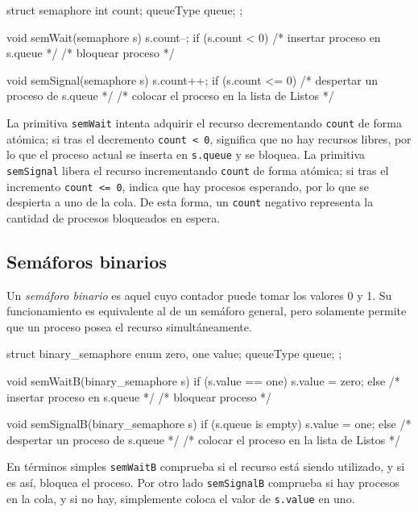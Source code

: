 \begin{ccode}[title=Definición de primitivas del semáforo]
struct semaphore {
  int count;
  queueType queue;
};

void semWait(semaphore s) {
  s.count--;
  if (s.count < 0) {
    /* insertar proceso en s.queue */
    /* bloquear proceso */
  }
}

void semSignal(semaphore s) {
  s.count++;
  if (s.count <= 0) {
    /* despertar un proceso de s.queue */
    /* colocar el proceso en la lista de Listos */
  }
}
\end{ccode}

La primitiva \texttt{semWait} intenta adquirir el recurso decrementando \texttt{count} de forma atómica; si tras el decremento \texttt{count < 0}, significa que no hay recursos libres, por lo que el proceso actual se inserta en \texttt{s.queue} y se bloquea. La primitiva \texttt{semSignal} libera el recurso incrementando \texttt{count} de forma atómica; si tras el incremento \texttt{count <= 0}, indica que hay procesos esperando, por lo que se despierta a uno de la cola. De esta forma, un \texttt{count} negativo representa la cantidad de procesos bloqueados en espera.

\subsection{Semáforos binarios}

Un \textit{semáforo binario} es aquel cuyo contador puede tomar los valores 0 y 1. Su funcionamiento es equivalente al de un semáforo general, pero solamente permite que un proceso posea el recurso simultáneamente.

\begin{ccode}[title=Definición de primitivas del semáforo binario]
struct binary_semaphore {
  enum {zero, one} value;
  queueType queue;
};

void semWaitB(binary_semaphore s) {
  if (s.value == one)
    s.value = zero;
  else {
    /* insertar proceso en s.queue */
    /* bloquear proceso */
  }
}

void semSignalB(binary_semaphore s) {
  if (s.queue is empty)
    s.value = one;
  else {
    /* despertar un proceso de s.queue */
    /* colocar el proceso en la lista de Listos */
  }
}
\end{ccode}

En términos simples \texttt{semWaitB} comprueba si el recurso está siendo utilizado, y si es así, bloquea el proceso. Por otro lado \texttt{semSignalB} comprueba si hay procesos en la cola, y si no hay, simplemente coloca el valor de \texttt{s.value} en uno.

